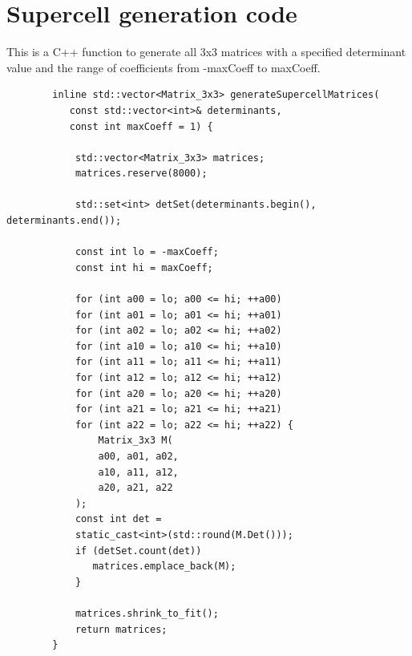 \documentclass[preprint]{iucr}              %
\numberwithin{equation}{section}
\begin{document}
{\appendix
\section{Supercell generation code}
\label{generator}
This is a C++ function to generate all 3x3 matrices with a specified determinant value and the range of coefficients from -maxCoeff to maxCoeff.

\begin{verbatim}
		inline std::vector<Matrix_3x3> generateSupercellMatrices(
           const std::vector<int>& determinants,
           const int maxCoeff = 1) {
			
			std::vector<Matrix_3x3> matrices;
			matrices.reserve(8000);
			
			std::set<int> detSet(determinants.begin(), determinants.end());
			
			const int lo = -maxCoeff;
			const int hi = maxCoeff;
			
			for (int a00 = lo; a00 <= hi; ++a00)
			for (int a01 = lo; a01 <= hi; ++a01)
			for (int a02 = lo; a02 <= hi; ++a02)
			for (int a10 = lo; a10 <= hi; ++a10)
			for (int a11 = lo; a11 <= hi; ++a11)
			for (int a12 = lo; a12 <= hi; ++a12)
			for (int a20 = lo; a20 <= hi; ++a20)
			for (int a21 = lo; a21 <= hi; ++a21)
			for (int a22 = lo; a22 <= hi; ++a22) {
				Matrix_3x3 M(
				a00, a01, a02,
				a10, a11, a12,
				a20, a21, a22
			);
			const int det =
			static_cast<int>(std::round(M.Det()));
			if (detSet.count(det))
			   matrices.emplace_back(M);
			}
			
			matrices.shrink_to_fit();
			return matrices;
		}
		
	\end{verbatim}
	
	

	
	
	
	
	
	
	
	
	
	
	
}
\end{document}
